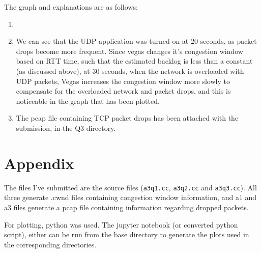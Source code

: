 \documentclass[12pt]{article}
\begin{document}
The graph and explanations are as follows:

\begin{enumerate}
    \item \begin{center}
    \end{center}

    \item We can see that the UDP application was turned on at 20 seconds, as 
    packet drops become more frequent. Since vegas changes it's congestion window 
    based on RTT time, such that the estimated backlog is less than a constant 
    (as discussed above), 
    at 30 seconds, when the network is overloaded with UDP 
    packets, Vegas increases the congestion window more slowly to compensate
    for the overloaded network and packet drops, and this is noticeable in the 
    graph that has been plotted.
    
    \item The pcap file containing TCP packet drops has been attached with the 
        submission, in the Q3 directory.

\end{enumerate}

\clearpage

\section*{Appendix}

The files I've submitted are the source files (\texttt{a3q1.cc}, \texttt{a3q2.cc}
and \texttt{a3q3.cc}). All three generate .cwnd files containing congestion 
window information, and a1 and a3 files generate a pcap file containing information
regarding dropped packets. 

For plotting, python was used. The jupyter notebook (or converted python script), 
either can be run from the base directory to generate the plots used in the 
corresponding directories.
\end{document}
